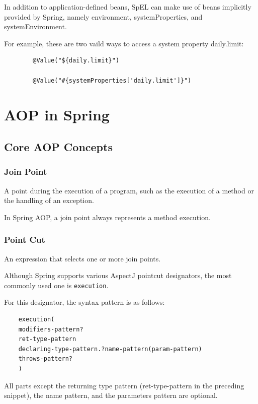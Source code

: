 \documentclass{scrartcl}
\begin{document}
    In addition to application-defined beans, SpEL can make use of beans implicitly provided by Spring, namely environment, systemProperties, and systemEnvironment.

    For example, these are two vaild ways to access a system property daily.limit:

    \begin{lstlisting}
        @Value("${daily.limit}")

        @Value("#{systemProperties['daily.limit']}")
    \end{lstlisting}


\section{AOP in Spring}

\subsection{Core AOP Concepts}

\subsubsection{Join Point}

A point during the execution of a program, such as the execution of a method or the handling of an exception.

In Spring AOP, a join point always represents a method execution.


\subsubsection{Point Cut}

An expression that selects one or more join points.

Although Spring supports various AspectJ pointcut designators, the most commonly used one is \lstinline{execution}.

For this designator, the syntax pattern is as follows:

\begin{lstlisting}
    execution(
    modifiers-pattern?
    ret-type-pattern
    declaring-type-pattern.?name-pattern(param-pattern)
    throws-pattern?
    )
\end{lstlisting}

All parts except the returning type pattern (ret-type-pattern in the preceding snippet), the name pattern, and the parameters pattern are optional.
\end{document}
